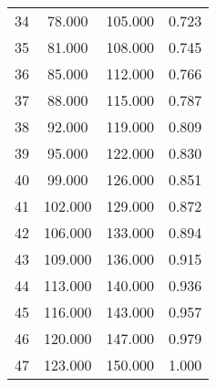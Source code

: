 \begin{tabular}{cccc}
  34 & 78.000 & 105.000 & 0.723 \\ 
  35 & 81.000 & 108.000 & 0.745 \\ 
  36 & 85.000 & 112.000 & 0.766 \\ 
  37 & 88.000 & 115.000 & 0.787 \\ 
  38 & 92.000 & 119.000 & 0.809 \\ 
  39 & 95.000 & 122.000 & 0.830 \\ 
  40 & 99.000 & 126.000 & 0.851 \\ 
  41 & 102.000 & 129.000 & 0.872 \\ 
  42 & 106.000 & 133.000 & 0.894 \\ 
  43 & 109.000 & 136.000 & 0.915 \\ 
  44 & 113.000 & 140.000 & 0.936 \\ 
  45 & 116.000 & 143.000 & 0.957 \\ 
  46 & 120.000 & 147.000 & 0.979 \\ 
  47 & 123.000 & 150.000 & 1.000 \\ 
   \hline
\end{tabular}
